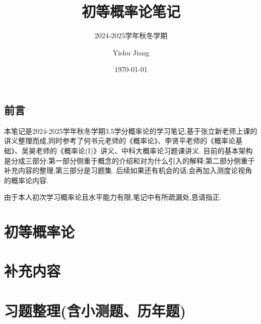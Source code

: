 \documentclass[lang=cn,10pt]{elegantbook}
\title{初等概率论笔记}
\subtitle{2024-2025学年秋冬学期}
\author{Yishu Jiang}
\institute{School of Economics,Zhejiang University}
\date{\today}
\begin{document}
\maketitle
\frontmatter
\chapter*{前言}
{\fangsong 
    本笔记是2024-2025学年秋冬学期3.5学分概率论的学习笔记,基于张立新老师上课的讲义整理而成,同时参考了何书元老师的《概率论》、李贤平老师的《概率论基础》、吴昊老师的《概率论(I)》讲义、中科大概率论习题课讲义.
    目前的基本架构是分成三部分:第一部分侧重于概念的介绍和对为什么引入的解释;第二部分侧重于补充内容的整理;第三部分是习题集.
    后续如果还有机会的话,会再加入测度论视角的概率论内容.

    由于本人初次学习概率论且水平能力有限,笔记中有所疏漏处,恳请指正.
}
\newpage
\tableofcontents

\mainmatter

\part{初等概率论}





\part{补充内容}
\part{习题整理(含小测题、历年题)}

\end{document}

